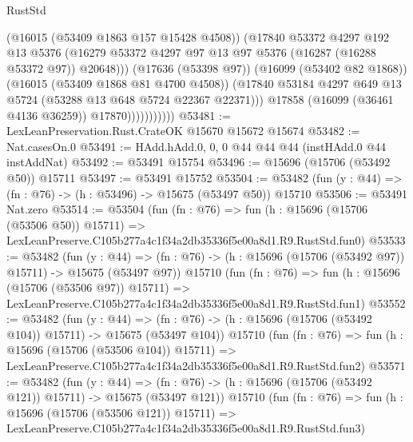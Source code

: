 \begin{lexlean}{RustStd}
\begin{coremodule}
                              (@16015 (@53409 @1863 @157 @15428 @4508))
                              (@17840
                                @53372
                                @4297
                                @192
                                @13
                                @5376
                                (@16279
                                  @53372
                                  @4297
                                  @97
                                  @13
                                  @97
                                  @5376
                                  (@16287 (@16288 @53372 @97))
                                  @20648)))
                            (@17636 (@53398 @97))
                            (@16099 (@53402 @82 @1868))
                            (@16015 (@53409 @1868 @81 @4700 @4508))
                            (@17840
                              @53184
                              @4297
                              @649
                              @13
                              @5724
                              (@53288 @13 @648 @5724 @22367 @22371)))
                          @17858
                          (@16099 (@36461 @4136 @36259))
                          @17870)))))))))))
@53481 := LexLeanPreservation.Rust.CrateOK @15670 @15672 @15674
@53482 := Nat.casesOn.{0}
@53491 := HAdd.hAdd.{0, 0, 0} @44 @44 @44 (instHAdd.{0} @44 instAddNat)
@53492 := @53491 @15754
@53496 := @15696 (@15706 (@53492 @50)) @15711
@53497 := @53491 @15752
@53504 := @53482 (fun (y : @44) => (fn : @76) -> (h : @53496) -> @15675 (@53497 @50)) @15710
@53506 := @53491 Nat.zero
@53514 := @53504
    (fun (fn : @76) =>
    fun (h : @15696 (@15706 (@53506 @50)) @15711) =>
    LexLeanPreserve.C105b277a4c1f34a2db35336f5e00a8d1.R9.RustStd.fun0)
@53533 := @53482
    (fun (y : @44) =>
    (fn : @76) -> (h : @15696 (@15706 (@53492 @97)) @15711) -> @15675 (@53497 @97))
    @15710
    (fun (fn : @76) =>
    fun (h : @15696 (@15706 (@53506 @97)) @15711) =>
    LexLeanPreserve.C105b277a4c1f34a2db35336f5e00a8d1.R9.RustStd.fun1)
@53552 := @53482
    (fun (y : @44) =>
    (fn : @76) -> (h : @15696 (@15706 (@53492 @104)) @15711) -> @15675 (@53497 @104))
    @15710
    (fun (fn : @76) =>
    fun (h : @15696 (@15706 (@53506 @104)) @15711) =>
    LexLeanPreserve.C105b277a4c1f34a2db35336f5e00a8d1.R9.RustStd.fun2)
@53571 := @53482
    (fun (y : @44) =>
    (fn : @76) -> (h : @15696 (@15706 (@53492 @121)) @15711) -> @15675 (@53497 @121))
    @15710
    (fun (fn : @76) =>
    fun (h : @15696 (@15706 (@53506 @121)) @15711) =>
    LexLeanPreserve.C105b277a4c1f34a2db35336f5e00a8d1.R9.RustStd.fun3)

\end{coremodule}
\end{lexlean}
